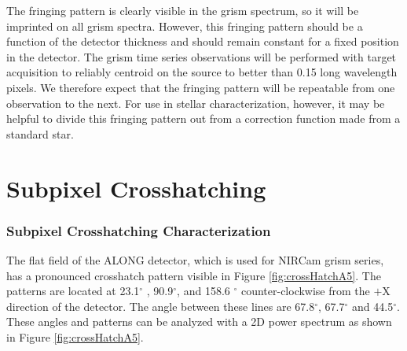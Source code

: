 \documentclass[]{aastex62}
\newcommand{\degree}{^\circ}
\begin{document}
The fringing pattern is clearly visible in the grism spectrum, so it will be imprinted on all grism spectra.
However, this fringing pattern should be a function of the detector thickness and should remain constant for a fixed position in the detector.
The grism time series observations will be performed with target acquisition to reliably centroid on the source to better than 0.15 long wavelength pixels.
We therefore expect that the fringing pattern will be repeatable from one observation to the next.
For use in stellar characterization, however, it may be helpful to divide this fringing pattern out from a correction function made from a standard star.


\section{Subpixel Crosshatching}

\subsubsection{Subpixel Crosshatching Characterization}
The flat field of the ALONG detector, which is used for NIRCam grism series, has a pronounced crosshatch pattern visible in Figure \ref{fig:crossHatchA5}.
The patterns are located at 23.1$\degree$ , 90.9$\degree$, and 158.6 $\degree$ counter-clockwise from the $+$X direction of the detector.
The angle between these lines are 67.8$\degree$, 67.7$\degree$ and 44.5$\degree$.
These angles and patterns can be analyzed with a 2D power spectrum as shown in Figure \ref{fig:crossHatchA5}.
\end{document}
